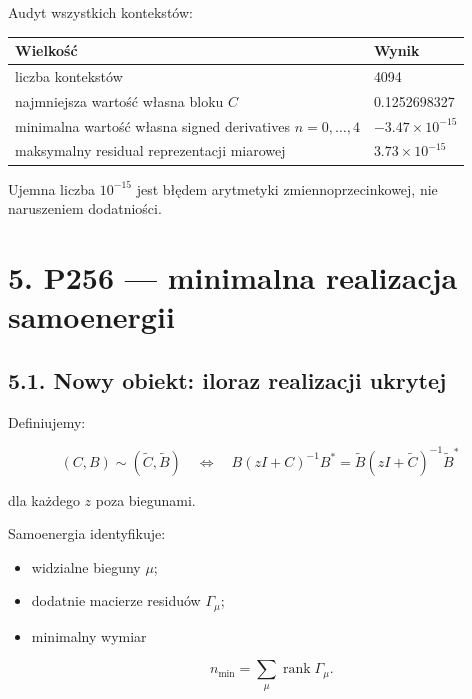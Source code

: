\documentclass[11pt,a4paper,openany]{report}
\begin{document}
Audyt wszystkich kontekstów:

\begin{center}
\begingroup\small
\setlength{\tabcolsep}{2.5pt}
\renewcommand{\arraystretch}{1.16}
\begin{longtable}{@{}p{}p{}@{}}
\toprule
\textbf{Wielkość} & \textbf{Wynik} \\
\midrule
\endhead
liczba kontekstów & 4094 \\
najmniejsza wartość własna bloku \(C\) & 0.1252698327 \\
minimalna wartość własna signed derivatives \(n=0,\ldots,4\) & \(-3.47\times10^{-15}\) \\
maksymalny residual reprezentacji miarowej & \(3.73\times10^{-15}\) \\
\bottomrule
\end{longtable}
\endgroup
\end{center}

Ujemna liczba \(10^{-15}\) jest błędem arytmetyki zmiennoprzecinkowej, nie naruszeniem dodatniości.

\chapter{5. P256 --- minimalna realizacja samoenergii}

\section{5.1. Nowy obiekt: iloraz realizacji ukrytej}

Definiujemy:

\[
(C,B)\sim(\widetilde C,\widetilde B)
\quad\Longleftrightarrow\quad
B(zI+C)^{-1}B^\ast
=
\widetilde B(zI+\widetilde C)^{-1}\widetilde B^\ast
\]

dla ka\.zdego \(z\) poza biegunami.

Samoenergia identyfikuje:

\begin{itemize}
\item 
widzialne bieguny \(\mu\);

\item 
dodatnie macierze residuów \(\Gamma_\mu\);

\item 
minimalny wymiar

\[
  n_{\min}=\sum_\mu\operatorname{rank}\Gamma_\mu.
  \]

\end{itemize}
\end{document}
